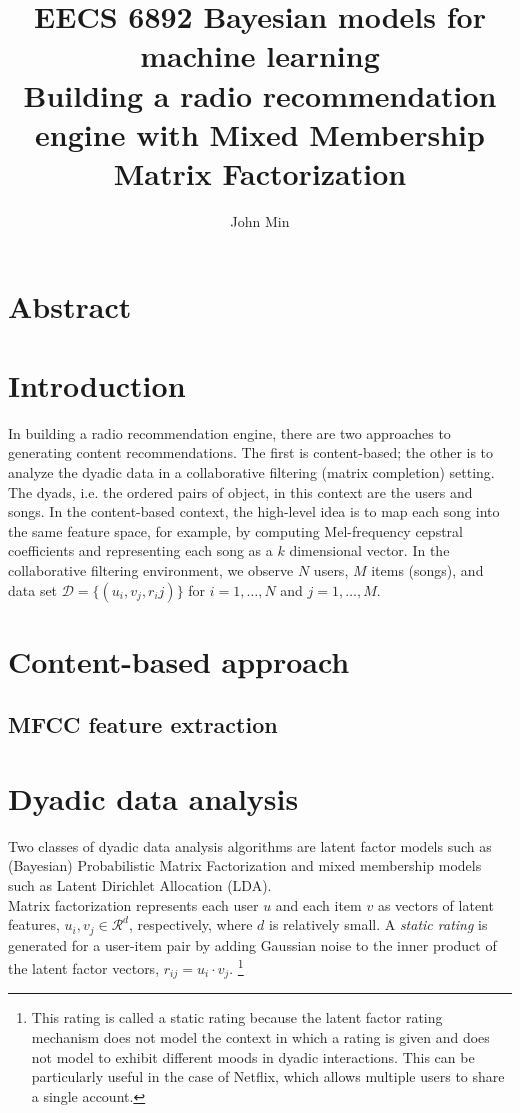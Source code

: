 \documentclass{article}
\author{John Min}
\title{\textbf{EECS 6892 Bayesian models for machine learning \\  Building a radio recommendation engine with Mixed Membership Matrix Factorization}}
\begin{document}
\maketitle

\section*{Abstract}

\pagebreak

\section{Introduction}
In building a radio recommendation engine, there are two approaches to generating content recommendations.  The first is content-based; the other is to analyze the dyadic data in a collaborative filtering (matrix completion) setting. The dyads, i.e. the ordered pairs of object, in this context are the users and songs.  In the content-based context, the high-level idea is to map each song into the same feature space, for example, by computing Mel-frequency cepstral coefficients and representing each song as a $k$ dimensional vector. In the collaborative filtering environment, we observe $N$ users, $M$ items (songs), and data set $\mathcal{D} = \{(u_i, v_j, r_ij)\}$ for $i=1, \ldots, N$ and $j=1, \ldots, M$.


\section{Content-based approach}
\subsection{MFCC feature extraction}




\section{Dyadic data analysis}

Two classes of dyadic data analysis algorithms are latent factor models such as (Bayesian) Probabilistic Matrix Factorization and mixed membership models such as Latent Dirichlet Allocation (LDA).\\

\noindent
Matrix factorization represents each user $u$ and each item $v$ as vectors of latent features, $u_i, v_j \in \mathcal{R}^d$, respectively, where $d$ is relatively small. A \emph{static rating} is generated for a user-item pair by adding Gaussian noise to the inner product of the latent factor vectors, $r_{ij} = u_i \cdot v_j$. 
\footnote{This rating is called a static rating because the latent factor rating mechanism does not model the context in which a rating is given and does not model to exhibit different moods in dyadic interactions. This can be particularly useful in the case of Netflix, which allows multiple users to share a single account.}
\end{document}
